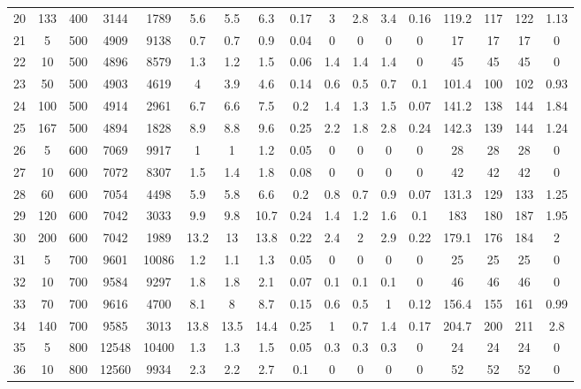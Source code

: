 \documentclass[11pt]{article}
\newcommand{\np}{\newpage}
\begin{document}
\begin{appendices}
\begin{landscape}
\begin{longtable}[c]{ccccc|cccc|cccc|cccc}
				20 & 133 & 400 & 3144 & 1789 & 5.6 & 5.5 & 6.3 & 0.17 & 3 & 2.8 & 3.4 & 0.16 & 119.2 & 117 & 122 & 1.13 \\ \np
				\rowcolor[HTML]{EFEFEF} 
				21 & 5 & 500 & 4909 & 9138 & 0.7 & 0.7 & 0.9 & 0.04 & 0 & 0 & 0 & 0 & 17 & 17 & 17 & 0 \\
				\rowcolor[HTML]{EFEFEF} 
				22 & 10 & 500 & 4896 & 8579 & 1.3 & 1.2 & 1.5 & 0.06 & 1.4 & 1.4 & 1.4 & 0 & 45 & 45 & 45 & 0 \\
				\rowcolor[HTML]{EFEFEF} 
				23 & 50 & 500 & 4903 & 4619 & 4 & 3.9 & 4.6 & 0.14 & 0.6 & 0.5 & 0.7 & 0.1 & 101.4 & 100 & 102 & 0.93 \\
				\rowcolor[HTML]{EFEFEF} 
				24 & 100 & 500 & 4914 & 2961 & 6.7 & 6.6 & 7.5 & 0.2 & 1.4 & 1.3 & 1.5 & 0.07 & 141.2 & 138 & 144 & 1.84 \\
				\rowcolor[HTML]{EFEFEF} 
				25 & 167 & 500 & 4894 & 1828 & 8.9 & 8.8 & 9.6 & 0.25 & 2.2 & 1.8 & 2.8 & 0.24 & 142.3 & 139 & 144 & 1.24 \\
				26 & 5 & 600 & 7069 & 9917 & 1 & 1 & 1.2 & 0.05 & 0 & 0 & 0 & 0 & 28 & 28 & 28 & 0 \\
				27 & 10 & 600 & 7072 & 8307 & 1.5 & 1.4 & 1.8 & 0.08 & 0 & 0 & 0 & 0 & 42 & 42 & 42 & 0 \\
				28 & 60 & 600 & 7054 & 4498 & 5.9 & 5.8 & 6.6 & 0.2 & 0.8 & 0.7 & 0.9 & 0.07 & 131.3 & 129 & 133 & 1.25 \\
				29 & 120 & 600 & 7042 & 3033 & 9.9 & 9.8 & 10.7 & 0.24 & 1.4 & 1.2 & 1.6 & 0.1 & 183 & 180 & 187 & 1.95 \\
				30 & 200 & 600 & 7042 & 1989 & 13.2 & 13 & 13.8 & 0.22 & 2.4 & 2 & 2.9 & 0.22 & 179.1 & 176 & 184 & 2 \\
				\rowcolor[HTML]{EFEFEF} 
				31 & 5 & 700 & 9601 & 10086 & 1.2 & 1.1 & 1.3 & 0.05 & 0 & 0 & 0 & 0 & 25 & 25 & 25 & 0 \\
				\rowcolor[HTML]{EFEFEF} 
				32 & 10 & 700 & 9584 & 9297 & 1.8 & 1.8 & 2.1 & 0.07 & 0.1 & 0.1 & 0.1 & 0 & 46 & 46 & 46 & 0 \\
				\rowcolor[HTML]{EFEFEF} 
				33 & 70 & 700 & 9616 & 4700 & 8.1 & 8 & 8.7 & 0.15 & 0.6 & 0.5 & 1 & 0.12 & 156.4 & 155 & 161 & 0.99 \\
				\rowcolor[HTML]{EFEFEF} 
				34 & 140 & 700 & 9585 & 3013 & 13.8 & 13.5 & 14.4 & 0.25 & 1 & 0.7 & 1.4 & 0.17 & 204.7 & 200 & 211 & 2.8 \\
				35 & 5 & 800 & 12548 & 10400 & 1.3 & 1.3 & 1.5 & 0.05 & 0.3 & 0.3 & 0.3 & 0 & 24 & 24 & 24 & 0 \\
				36 & 10 & 800 & 12560 & 9934 & 2.3 & 2.2 & 2.7 & 0.1 & 0 & 0 & 0 & 0 & 52 & 52 & 52 & 0 \\

\end{longtable}
\end{landscape}
\end{appendices}
\end{document}
